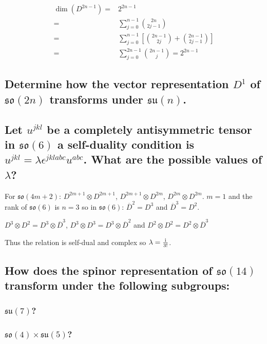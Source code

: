 \documentclass[main.tex]{subfiles}
\begin{document}
\begin{align}
\dim(D^{2n-1})=&2^{2n-1}\\
=&\sum^{n-1}_{j=0}\binom{2n}{2j-1}\\
=&\sum^{n-1}_{j=0}\left[\binom{2n-1}{2j}+\binom{2n-1}{2j-1}\right]\\
=&\sum^{2n-1}_{j=0}\binom{2n-1}{j}=2^{2n-1}
\end{align}

\subsection{Determine how the vector representation $D^1$ of $\mathfrak{so}(2n)$ transforms under $\mathfrak{su}(n)$.}

\subsection{Let $u^{jkl}$ be a completely antisymmetric tensor in $\mathfrak{so}(6)$ a self-duality condition is $u^{jkl}=\lambda\epsilon^{jklabc}u^{abc}$. What are the possible values of $\lambda$?}
For $\mathfrak{so}(4m+2)$: $D^{2m+1}\otimes D^{2m+1}$, $D^{2m+1}\otimes D^{2m}$, $D^{2m}\otimes D^{2m}$. $m=1$ and the rank of $\mathfrak{so}(6)$ is $n=3$ so in $\mathfrak{so}(6)$: $\overline{D}^2=D^3$ and $\overline{D}^3=D^2$.

$D^3\otimes D^2=D^3\otimes \overline{D}^3$, $D^3\otimes D^3=D^3\otimes \overline{D}^2$ and $D^2\otimes D^2=D^2\otimes \overline{D}^3$

Thus the relation is self-dual and complex so $\lambda=\frac{\mathrm{i}}{3!}$.


\subsection{How does the spinor representation of $\mathfrak{so}(14)$ transform under the following subgroups:}
\subsubsection{$\mathfrak{su}(7)$?}

\subsubsection{$\mathfrak{so}(4)\times\mathfrak{su}(5)$?}
\end{document}
